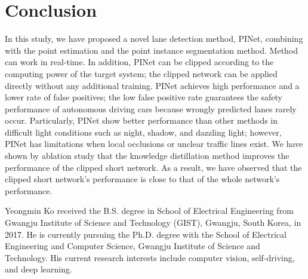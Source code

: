 \documentclass[journal]{IEEEtran}
\begin{document}
\section{Conclusion}
In this study, we have proposed a novel lane detection method, PINet, combining with the point estimation and the point instance segmentation method. Method can work in real-time. In addition, PINet can be clipped according to the computing power of the target system; the clipped network can be applied directly without any additional training. PINet achieves high performance and a lower rate of false positives; the low false positive rate guarantees the safety performance of autonomous driving cars because wrongly predicted lanes rarely occur. Particularly, PINet show better performance than other methods in difficult light conditions such as night, shadow, and dazzling light; however, PINet has limitations when local occlusions or unclear traffic lines exist. We have shown by ablation study that the knowledge distillation method improves the performance of the clipped short network. As a result, we have observed that the clipped short network's performance is close to that of the whole network's performance. 
















\ifCLASSOPTIONcaptionsoff
  \newpage
\fi
















    \begin{IEEEbiography}{Yeongmin Ko} received the B.S. degree in School of Electrical Engineering from Gwangju Institute of Science and Technology (GIST), Gwangju, South Korea, in 2017. He is currently pursuing the Ph.D. degree with the School of Electrical Engineering and Computer Science, Gwangju Institute of Science and Technology. His current research interests include computer vision, self-driving, and deep learning.
    \end{IEEEbiography}
\end{document}
